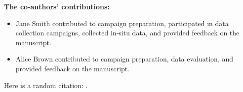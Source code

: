 \begin{refsection}
    \vspace{1em}
    \noindent
    \textbf{The co‐authors’ contributions:}
    \begin{itemize}
      \item Jane Smith contributed to campaign preparation, participated in data collection campaigns, collected in‐situ data, and provided feedback on the manuscript.
      \item Alice Brown contributed to campaign preparation, data evaluation, and provided feedback on the manuscript.
    \end{itemize}
    


    \lipsum[3-4]  %
    Here is a random citation: \cite{lipsum2025}.

  \printbibliography[heading=subbibliography, title={References}]
\end{refsection}